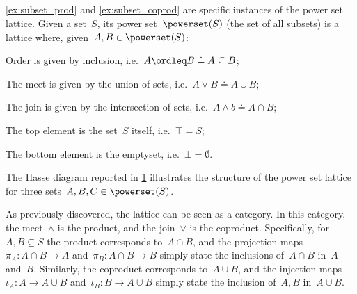 \subsection{}
\cref{ex:subset_prod} and \cref{ex:subset_coprod} are specific instances of the power set lattice. Given a set~$S$, its power set~$\powerset(S)$ (the set of all subsets) is a lattice where, given~$A,B\in \powerset(S)$:
\begin{compactitem}
    \item Order is given by inclusion, i.e.~$A\ordleq B \doteq A\subseteq B$;
    \item The meet is given by the union of sets, i.e.~$A\vee B \doteq A\cup B$;
    \item The join is given by the intersection of sets, i.e.~$A\wedge b \doteq A\cap B$;
    \item The top element is the set~$S$ itself, i.e.~$\top = S$;
    \item The bottom element is the emptyset, i.e.~$\bot = \emptyset$.
\end{compactitem}
The Hasse diagram reported in \cref{fig:prod_coprod_power} illustrates the structure of the power set lattice for three sets~$A,B,C\in \powerset(S)$.

\begin{figure}[h]
    \begin{center}
    \end{center}
    \caption{\label{fig:prod_coprod_power}}
\end{figure}
As previously discovered, the lattice can be seen as a category. In this category, the meet~$\wedge$ is the product, and the join~$\vee$ is the coproduct. Specifically, for~$A,B\subseteq S$ the product corresponds to~$A\cap B$, and the projection maps~$\pi_A\colon A\cap B\to A$ and~$\pi_B\colon A\cap B\to B$ simply state the inclusions of~$A\cap B$ in~$A$ and~$B$. Similarly, the coproduct corresponds to~$A\cup B$, and the injection maps~$\iota_A\colon A\to A\cup B$ and~$\iota_B\colon B\to A\cup B$ simply state the inclusion of~$A,B$ in~$A\cup B$.

\subsubsection{}

